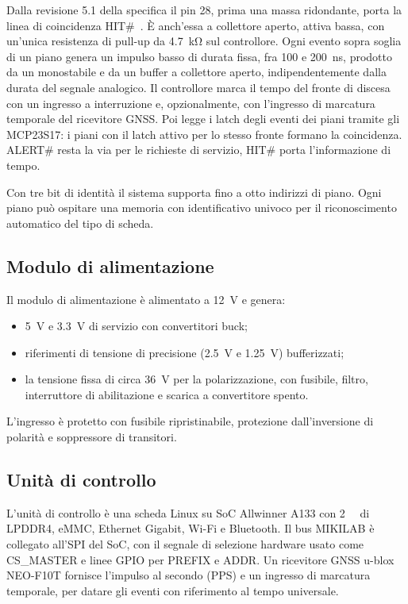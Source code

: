 \documentclass[11pt,a4paper]{article}
\begin{document}
Dalla revisione 5.1 della specifica il pin 28, prima una massa ridondante, porta la linea di coincidenza HIT\#~\cite{mikilab}. È anch'essa a collettore aperto, attiva bassa, con un'unica resistenza di pull-up da \SI{4.7}{\kilo\ohm} sul controllore. Ogni evento sopra soglia di un piano genera un impulso basso di durata fissa, fra 100 e \SI{200}{\nano\second}, prodotto da un monostabile e da un buffer a collettore aperto, indipendentemente dalla durata del segnale analogico. Il controllore marca il tempo del fronte di discesa con un ingresso a interruzione e, opzionalmente, con l'ingresso di marcatura temporale del ricevitore GNSS. Poi legge i latch degli eventi dei piani tramite gli MCP23S17: i piani con il latch attivo per lo stesso fronte formano la coincidenza. ALERT\# resta la via per le richieste di servizio, HIT\# porta l'informazione di tempo.

Con tre bit di identità il sistema supporta fino a otto indirizzi di piano. Ogni piano può ospitare una memoria con identificativo univoco per il riconoscimento automatico del tipo di scheda.

\subsection{Modulo di alimentazione}

Il modulo di alimentazione è alimentato a \SI{12}{\volt} e genera:
\begin{itemize}
  \item \SI{5}{\volt} e \SI{3.3}{\volt} di servizio con convertitori buck;
  \item riferimenti di tensione di precisione (\SI{2.5}{\volt} e \SI{1.25}{\volt}) bufferizzati;
  \item la tensione fissa di circa \SI{36}{\volt} per la polarizzazione, con fusibile, filtro, interruttore di abilitazione e scarica a convertitore spento.
\end{itemize}
L'ingresso è protetto con fusibile ripristinabile, protezione dall'inversione di polarità e soppressore di transitori.

\subsection{Unità di controllo}

L'unità di controllo è una scheda Linux su SoC Allwinner A133 con \SI{2}{\giga\byte} di LPDDR4, eMMC, Ethernet Gigabit, Wi-Fi e Bluetooth. Il bus MIKILAB è collegato all'SPI del SoC, con il segnale di selezione hardware usato come CS\_MASTER e linee GPIO per PREFIX e ADDR. Un ricevitore GNSS u-blox NEO-F10T fornisce l'impulso al secondo (PPS) e un ingresso di marcatura temporale, per datare gli eventi con riferimento al tempo universale.
\end{document}
